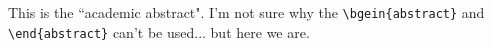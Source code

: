 This is the ``academic abstract". I'm not sure why the \verb|\bgein{abstract}| and \verb|\end{abstract}| can't be used... but here we are.